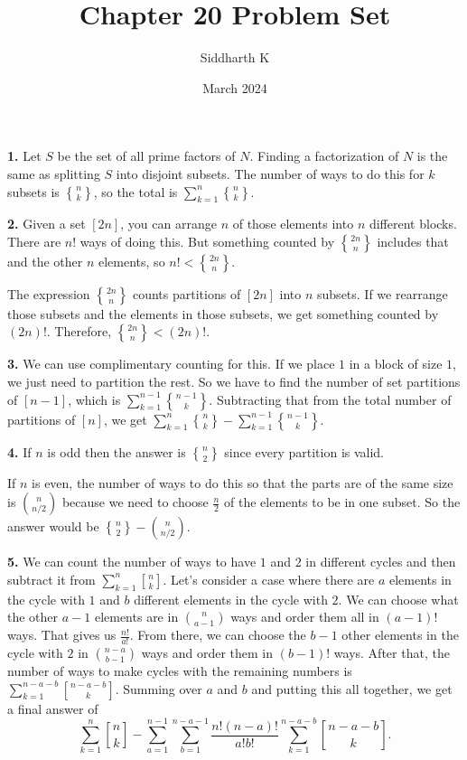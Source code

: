 \documentclass{article}
\title{Chapter 20 Problem Set}
\author{Siddharth K}
\date{March 2024}
\begin{document}
\maketitle

\textbf{1.} Let $S$ be the set of all prime factors of $N$. Finding a factorization of $N$ is the same as splitting $S$ into disjoint subsets. The number of ways to do this for $k$ subsets is $n\brace k$, so the total is $\sum_{k = 1}^n {n\brace k}$.
\newline

\textbf{2.} Given a set $[2n]$, you can arrange $n$ of those elements into $n$ different blocks. There are $n!$ ways of doing this. But something counted by ${{2n}\brace n}$ includes that and the other $n$ elements, so $n! < {{2n}\brace n}$.
\newline

The expression ${{2n}\brace n}$ counts partitions of $[2n]$ into $n$ subsets. If we rearrange those subsets and the elements in those subsets, we get something counted by $(2n)!$. Therefore, ${{2n}\brace n} < (2n)!$.
\newline

\textbf{3.} We can use complimentary counting for this. If we place $1$ in a block of size $1$, we just need to partition the rest. So we have to find the number of set partitions of $[n - 1]$, which is $\sum_{k = 1}^{n - 1} {{n - 1}\brace k}$. Subtracting that from the total number of partitions of $[n]$, we get $\sum_{k = 1}^{n} {n\brace k} - \sum_{k = 1}^{n - 1} {{n - 1}\brace k}$.
\newline

\textbf{4.} If $n$ is odd then the answer is $n\brace 2$ since every partition is valid.
\newline

If $n$ is even, the number of ways to do this so that the parts are of the same size is ${n\choose {n/2}}$ because we need to choose $\frac{n}{2}$ of the elements to be in one subset. So the answer would be ${n\brace 2} - {n\choose {n/2}}$.
\newline

\textbf{5.} We can count the number of ways to have $1$ and $2$ in different cycles and then subtract it from $\sum_{k = 1}^n {n\brack k}$. Let's consider a case where there are $a$ elements in the cycle with $1$ and $b$ different elements in the cycle with $2$. We can choose what the other $a - 1$ elements are in ${n\choose {a - 1}}$ ways and order them all in $(a - 1)!$ ways. That gives us $\frac{n!}{a!}$. From there, we can choose the $b - 1$ other elements in the cycle with $2$ in ${{n - a}\choose {b - 1}}$ ways and order them in $(b - 1)!$ ways. After that, the number of ways to make cycles with the remaining numbers is $\sum_{k = 1}^{n - a - b} {{n - a - b}\brack k}$. Summing over $a$ and $b$ and putting this all together, we get a final answer of $$\sum_{k = 1}^n {n\brack k} - \sum_{a = 1}^{n - 1}\sum_{b = 1}^{n - a - 1}\frac{n!(n - a)!}{a!b!}\sum_{k = 1}^{n - a - b}{{n - a - b}\brack k}.$$
\end{document}
